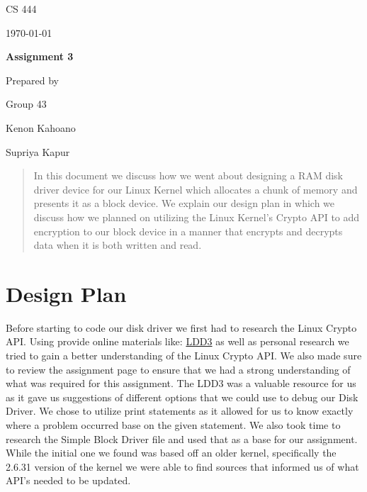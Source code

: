 \documentclass[onecolumn, draftclsnofoot,10pt, compsoc]{IEEEtran}
\def \TeamNumber{		43}
\def \GroupMemberOne{			Kenon Kahoano}
\def \GroupMemberTwo{			Supriya Kapur}
\def \ProjectName{		Assignment 3}
\newcommand{\NameSigPair}[1]{\par
\makebox[2.75in][r]{#1} \hfil 	\makebox[3.25in]{\makebox[2.25in]{\hrulefill} \hfill		\makebox[.75in]{\hrulefill}}
\par\vspace{-12pt} \textit{\tiny\noindent
\makebox[2.75in]{} \hfil		\makebox[3.25in]{\makebox[2.25in][r]{Signature} \hfill	\makebox[.75in][r]{Date}}}}
\renewcommand{\NameSigPair}[1]{#1}
\begin{document}
\begin{titlepage}
    \begin{singlespace} 
        \par\vspace{.2in}
        \centering
        \scshape{
            \huge CS 444 \par
            {\large\today}\par
            \vspace{.5in}
            \textbf{\Huge\ProjectName}\par
            \vfill
            {\large Prepared by }\par
            Group\TeamNumber\par
            {\Large
                \NameSigPair{\GroupMemberOne}\par
                \NameSigPair{\GroupMemberTwo}\par
            }
            \vspace{20pt}
        }
        \begin{abstract}
	In this document we discuss how we went about designing a RAM disk driver device for our Linux Kernel which allocates a chunk of memory and presents it as a block device. We explain our design plan in which we discuss how we planned on utilizing the Linux Kernel's Crypto API to add encryption to our block device in a manner that encrypts and decrypts data when it is both written and read.
            
        \end{abstract}     
    \end{singlespace}
\end{titlepage}
\newpage
{}
\clearpage


\section{Design Plan}
Before starting to code our disk driver we first had to research the Linux Crypto API. Using provide online materials like: \href{https://lwn.net/Kernel/LDD3/}{LDD3} as well as personal research we tried to gain a better understanding of the Linux Crypto API. We also made sure to review the assignment page to ensure that we had a strong understanding of what was required for this assignment. The LDD3 was a valuable resource for us as it gave us suggestions of different options that we could use to debug our Disk Driver. We chose to utilize print statements as it allowed for us to know exactly where a problem occurred base on the given statement. We also took time to research the Simple Block Driver file and used that as a base for our assignment. While the initial one we found was based off an older kernel, specifically the 2.6.31 version of the kernel we were able to find sources that informed us of what API's needed to be updated.
\end{document}
